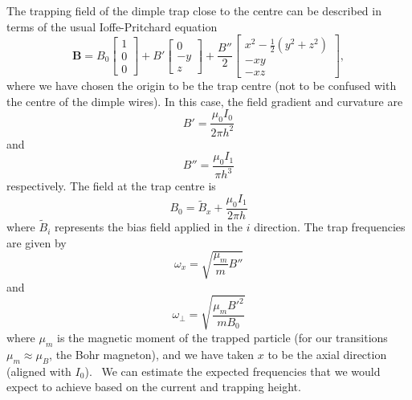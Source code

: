 The trapping field of the dimple trap close to the centre can be described in
terms of the usual Ioffe-Pritchard equation~\cite{Foot2005}
%
\begin{equation}
  \mathbf{B} = B_0 \begin{bmatrix} 1 \\ 0 \\0 \end{bmatrix}
               + B' \begin{bmatrix} 0 \\ -y \\ z \end{bmatrix}
               + \frac{B''}{2} \begin{bmatrix} 
                  x^2 - \frac{1}{2}(y^2 + z^2) \\
                  -xy \\
                  -xz
               \end{bmatrix},
\end{equation}
%
where we have chosen the origin to be the trap centre (not to be confused with
the centre of the dimple wires). In this case, the field gradient and curvature
are
%
\begin{equation}
  B' = \frac{\mu_0 I_0}{2\pi h^2}
\end{equation}
%
and
%
\begin{equation}
  B'' = \frac{\mu_0 I_1}{\pi h^3}
\end{equation}
%
respectively. The field at the trap centre is
%
\begin{equation}
  B_0 = \widetilde{B}_x + \frac{\mu_0 I_1}{2\pi h}
  \label{chiptraps:eqn:bias}
\end{equation}
%
where $\widetilde{B}_i$ represents the bias field applied in the $i$ direction.
The trap frequencies are given by
\begin{equation}
  \omega_x = \sqrt{\frac{\mu_m}{m}B''}
  \label{chiptraps:eqn:axisfreq}
\end{equation}
and
\begin{equation}
  \omega_\perp = \sqrt{\frac{\mu_m {B'}^2}{m B_0}}
  \label{chiptraps:eqn:transfreq}
\end{equation}
where $\mu_m$ is the magnetic moment of the trapped particle (for our \CaF{}
transitions $\mu_m \approx \mu_B$, the Bohr magneton), and we have taken $x$ to
be the axial direction (aligned with $I_0$).~\cite{2011Ac} We can estimate the
expected frequencies that we would expect to achieve based on the current and
trapping height.

